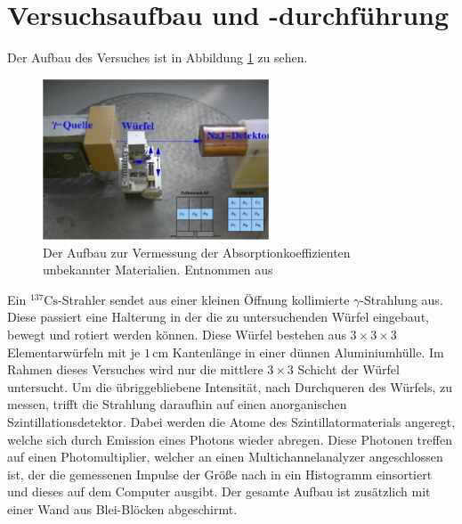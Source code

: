 \newpage
\section{Versuchsaufbau und -durchführung}
        Der Aufbau des Versuches ist in Abbildung \ref{fig:Aufbau} zu sehen.
        \begin{figure}[h]
          \centering
          \includegraphics[width = 0.6\textwidth]{pictures/Aufbau.png}
          \caption{Der Aufbau zur Vermessung der Absorptionkoeffizienten unbekannter Materialien. Entnommen aus \cite{tu_dortmund_versuchsanleitung_2021-6}}
          \label{fig:Aufbau}
        \end{figure}
        Ein $^{137}\text{Cs}$-Strahler sendet aus einer kleinen Öffnung kollimierte $\gamma$-Strahlung aus.
        Diese passiert eine Halterung in der die zu untersuchenden Würfel eingebaut, bewegt und rotiert werden können.
        Diese Würfel bestehen aus $3\times3\times3$ Elementarwürfeln mit je $1\,\text{cm}$ Kantenlänge in einer dünnen Aluminiumhülle.
        Im Rahmen dieses Versuches wird nur die mittlere $3\times3$ Schicht der Würfel untersucht.
        Um die übriggebliebene Intensität, nach Durchqueren des Würfels, zu messen,
        trifft die Strahlung daraufhin auf einen anorganischen Szintillationsdetektor.
        Dabei werden die Atome des Szintillatormaterials angeregt, welche sich durch Emission eines Photons wieder abregen.
        Diese Photonen treffen auf einen Photomultiplier, welcher an einen Multichannelanalyzer angeschlossen ist,
        der die gemessenen Impulse der Größe nach in ein Histogramm einsortiert und dieses auf dem Computer ausgibt.
        Der gesamte Aufbau ist zusätzlich mit einer Wand aus Blei-Blöcken abgeschirmt.

